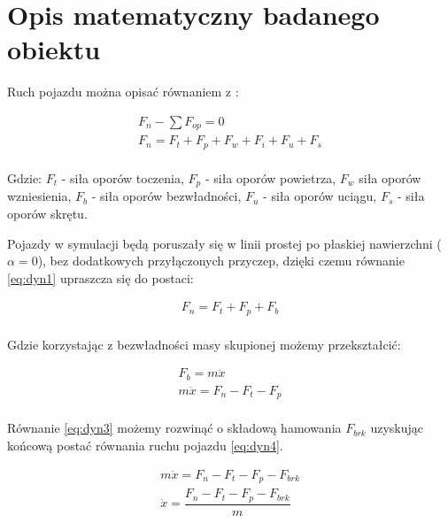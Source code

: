 \documentclass[12pt, a4paper, headings=normal]{article}
\begin{document}
\section{Opis matematyczny badanego obiektu}

Ruch pojazdu można opisać równaniem z \cite{arczy}:

\begin{equation}
	\label{eq:dyn1}
\begin{array}{c}
	F_n - \sum F_{op} = 0 \\
	F_n = F_t + F_p + F_w + F_i + F_u + F_s\\
\end{array}
\end{equation}

Gdzie: $F_t$ - siła oporów toczenia, $F_p$ - siła oporów powietrza, $F_w$ siła oporów
wzniesienia, $F_b$ - siła oporów bezwładności, $F_u$ - siła oporów uciągu, 
$F_s$ - siła oporów skrętu.

Pojazdy w symulacji będą poruszały się w linii prostej po płaskiej nawierzchni ($\alpha = 0$),
bez dodatkowych przyłączonych przyczep, dzięki czemu równanie \eqref{eq:dyn1} upraszcza się
do postaci:

\begin{equation}
	\label{eq:dyn2}
\begin{array}{c}
	F_n = F_t + F_p + F_b \\
\end{array}
\end{equation}

Gdzie korzystając z bezwładności masy skupionej możemy przekształcić:

\begin{equation}
	\label{eq:dyn3}
\begin{array}{c}
	F_b =  m \ddot{x} \\
	m \ddot{x} = F_n - F_t - F_p\\
\end{array}
\end{equation}

Równanie \eqref{eq:dyn3} możemy rozwinąć o składową hamowania $F_{brk}$ uzyskując
końcową postać równania ruchu pojazdu \eqref{eq:dyn4}.

\begin{equation}
	\label{eq:dyn4}
\begin{array}{c}
	m \ddot{x} = F_n - F_t - F_p - F_{brk}\\[10pt]
	\ddot{x} = \dfrac{F_n - F_t - F_p - F_{brk}}{m}\\
\end{array}
\end{equation}
\end{document}
